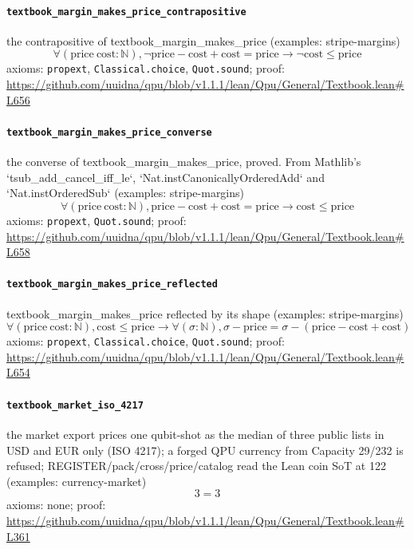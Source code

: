 \documentclass[11pt]{article}
\begin{document}
\paragraph{\texttt{textbook\_margin\_makes\_price\_contrapositive}}
the contrapositive of textbook\_margin\_makes\_price (examples: stripe-margins)
\[ \forall (\mathrm{price}\ \mathrm{cost} : \mathbb{N}), \neg \mathrm{price} - \mathrm{cost} + \mathrm{cost} = \mathrm{price} \to \neg \mathrm{cost} \le \mathrm{price} \]
\noindent axioms: \texttt{propext}, \texttt{Classical.choice}, \texttt{Quot.sound}; proof: \url{https://github.com/uuidna/qpu/blob/v1.1.1/lean/Qpu/General/Textbook.lean\#L656}

\paragraph{\texttt{textbook\_margin\_makes\_price\_converse}}
the converse of textbook\_margin\_makes\_price, proved. From Mathlib's `tsub\_add\_cancel\_iff\_le`, `Nat.instCanonicallyOrderedAdd` and `Nat.instOrderedSub` (examples: stripe-margins)
\[ \forall (\mathrm{price}\ \mathrm{cost} : \mathbb{N}), \mathrm{price} - \mathrm{cost} + \mathrm{cost} = \mathrm{price} \to \mathrm{cost} \le \mathrm{price} \]
\noindent axioms: \texttt{propext}, \texttt{Quot.sound}; proof: \url{https://github.com/uuidna/qpu/blob/v1.1.1/lean/Qpu/General/Textbook.lean\#L658}

\paragraph{\texttt{textbook\_margin\_makes\_price\_reflected}}
textbook\_margin\_makes\_price reflected by its shape (examples: stripe-margins)
\[ \forall (\mathrm{price}\ \mathrm{cost} : \mathbb{N}), \mathrm{cost} \le \mathrm{price} \to \forall (\sigma : \mathbb{N}), \sigma - \mathrm{price} = \sigma - (\mathrm{price} - \mathrm{cost} + \mathrm{cost}) \]
\noindent axioms: \texttt{propext}, \texttt{Classical.choice}, \texttt{Quot.sound}; proof: \url{https://github.com/uuidna/qpu/blob/v1.1.1/lean/Qpu/General/Textbook.lean\#L654}

\paragraph{\texttt{textbook\_market\_iso\_4217}}
the market export prices one qubit-shot as the median of three public lists in USD and EUR only (ISO 4217); a forged QPU currency from Capacity 29/232 is refused; REGISTER/pack/cross/price/catalog read the Lean coin SoT at 122 (examples: currency-market)
\[ 3 = 3 \]
\noindent axioms: none; proof: \url{https://github.com/uuidna/qpu/blob/v1.1.1/lean/Qpu/General/Textbook.lean\#L361}
\end{document}
